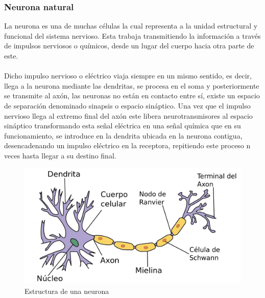 \documentclass[12pt, a4paper, titlepage]{report}
\begin{document}
						\subsubsection*{Neurona natural}
						La neurona es una de muchas células la cual representa a la unidad estructural y funcional del sistema nervioso. Esta trabaja transmitiendo la información a través de impulsos nerviosos o químicos, desde un lugar del cuerpo hacia otra parte de este.\\\\
						Dicho impulso nervioso o eléctrico viaja siempre en un mismo sentido, es decir, llega a la neurona mediante las dendritas, se procesa en el soma y posteriormente se transmite al axón, las neuronas no están en contacto entre sí, existe un espacio de separación denominado sinapsis o espacio sináptico. Una vez que el impulso nervioso llega al extremo final del axón este libera neurotransmisores al espacio sináptico transformando esta señal eléctrica en una señal química que en su funcionamiento, se introduce en la dendrita ubicada en la neurona contigua, desencadenando un impulso eléctrico en la receptora, repitiendo este proceso n veces hasta llegar a su destino final.\cite{refNeuronaNat}
						\begin{figure}[H]
							\includegraphics[width=12cm]{./imagenes/MarcoTeorico/Neurona.jpg}
							\centering  
							\caption{Estructura de una neurona \cite{refNeuronaNat2}}
						\end{figure}			
\end{document}
